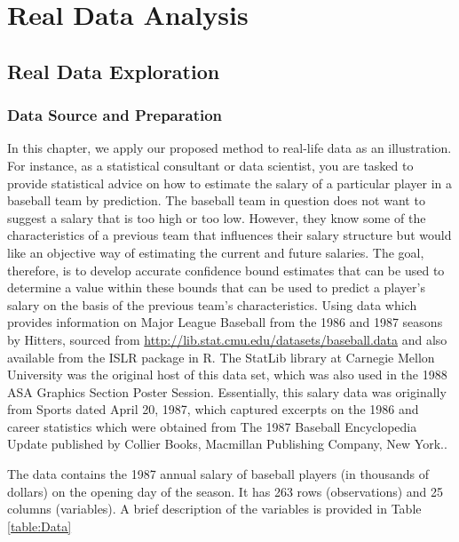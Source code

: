 
\chapter{Real Data Analysis}
\section{Real Data Exploration}
\subsection{Data Source and Preparation}
In this chapter, we apply our proposed method to real-life data as an illustration. For instance, as a statistical consultant or data scientist, you are tasked to provide statistical advice on how to estimate the salary of a particular player in a baseball team by prediction. The baseball team in question does not want to suggest a salary that is too high or too low. However, they know some of the characteristics of a previous team that influences their salary structure but would like an objective way of estimating the current and future salaries. The goal, therefore, is to develop accurate confidence bound estimates that can be used to determine a value within these bounds that can be used to predict a player's salary on the basis of the previous team's characteristics. Using data which provides information on Major League Baseball from the 1986 and 1987 seasons by Hitters, sourced from \url{http://lib.stat.cmu.edu/datasets/baseball.data} and also available from the ISLR package in R. The StatLib library at Carnegie Mellon University was the original host of this data set, which was also used in the 1988 ASA Graphics Section Poster Session.  Essentially, this salary data was originally from Sports dated April 20, 1987, which captured excerpts on the 1986 and career statistics which were obtained from The 1987 Baseball Encyclopedia Update published by Collier Books, Macmillan Publishing Company, New York.\citep{james2017data}.

The data contains the 1987 annual salary of baseball players (in thousands of dollars) on the opening day of the season. It has 263 rows (observations) and 25 columns (variables). A brief description of the variables is provided in Table \ref{table:Data}


